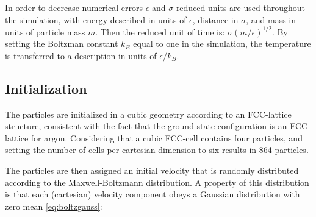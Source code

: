 \documentclass[
10pt, %
a4paper, %
oneside, %
headinclude,footinclude, %
BCOR5mm, %
]{scrartcl}
\newcommand{\insertcode}[2]{\begin{itemize}\item[]\end{itemize}} %
\begin{document}
In order to decrease numerical errors $\epsilon$ and $\sigma$ reduced units are used throughout the simulation, with energy described in units of $\epsilon$,  distance in $\sigma$, and mass in units of particle mass $m$.  Then the reduced unit of time is: $\sigma(m/\epsilon)^{1/2}$.
By setting the Boltzman constant $k_B$ equal to one in the simulation, the temperature is transferred to a description in units of $\epsilon / k_B$.

\subsection{Initialization}

The particles are initialized in a cubic geometry according to an FCC-lattice structure, consistent with the fact that the ground state configuration is an FCC lattice for argon. Considering that a cubic FCC-cell contains four particles, and setting the number of cells per cartesian dimension to six results in 864 particles.








The particles are then assigned an initial velocity that is randomly distributed according to the Maxwell-Boltzmann distribution. A property of this distribution is that each (cartesian) velocity component obeys a Gaussian distribution with zero mean \ref{eq:boltzgauss}:
\end{document}
